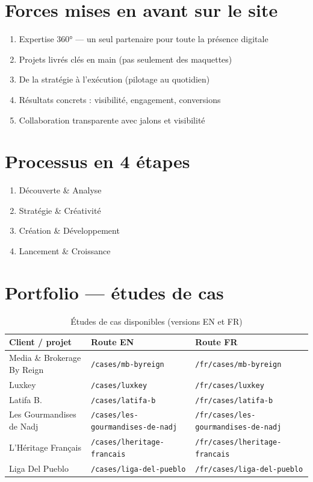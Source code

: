 \documentclass[11pt,a4paper]{report}
\begin{document}
\section{Forces mises en avant sur le site}

\begin{enumerate}[leftmargin=*]
  \item Expertise 360° — un seul partenaire pour toute la présence digitale
  \item Projets livrés clés en main (pas seulement des maquettes)
  \item De la stratégie à l'exécution (pilotage au quotidien)
  \item Résultats concrets : visibilité, engagement, conversions
  \item Collaboration transparente avec jalons et visibilité
\end{enumerate}

\section{Processus en 4 étapes}

\begin{enumerate}[leftmargin=*]
  \item Découverte \& Analyse
  \item Stratégie \& Créativité
  \item Création \& Développement
  \item Lancement \& Croissance
\end{enumerate}

\section{Portfolio — études de cas}

\begin{table}[h]
\centering
\begin{tabular}{@{}lll@{}}
\toprule
\textbf{Client / projet} & \textbf{Route EN} & \textbf{Route FR} \\
\midrule
Media \& Brokerage By Reign & \texttt{/cases/mb-byreign} & \texttt{/fr/cases/mb-byreign} \\
Luxkey & \texttt{/cases/luxkey} & \texttt{/fr/cases/luxkey} \\
Latifa B. & \texttt{/cases/latifa-b} & \texttt{/fr/cases/latifa-b} \\
Les Gourmandises de Nadj & \texttt{/cases/les-gourmandises-de-nadj} & \texttt{/fr/cases/les-gourmandises-de-nadj} \\
L'Héritage Français & \texttt{/cases/lheritage-francais} & \texttt{/fr/cases/lheritage-francais} \\
Liga Del Pueblo & \texttt{/cases/liga-del-pueblo} & \texttt{/fr/cases/liga-del-pueblo} \\
\bottomrule
\end{tabular}
\caption{Études de cas disponibles (versions EN et FR)}
\end{table}
\end{document}
